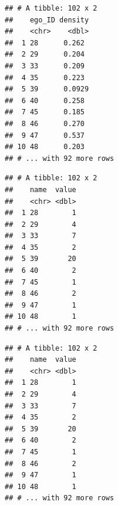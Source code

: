 \documentclass[
]{book}
\newenvironment{Shaded}{\begin{snugshade}}{\end{snugshade}}
\newcommand{\CommentTok}[1]{\textcolor[rgb]{0.56,0.35,0.01}{\textit{#1}}}
\newcommand{\FunctionTok}[1]{\textcolor[rgb]{0.00,0.00,0.00}{#1}}
\newcommand{\NormalTok}[1]{#1}
\newcommand{\SpecialCharTok}[1]{\textcolor[rgb]{0.00,0.00,0.00}{#1}}
\begin{document}
\begin{verbatim}
## # A tibble: 102 x 2
##    ego_ID density
##    <chr>    <dbl>
##  1 28      0.262 
##  2 29      0.204 
##  3 33      0.209 
##  4 35      0.223 
##  5 39      0.0929
##  6 40      0.258 
##  7 45      0.185 
##  8 46      0.270 
##  9 47      0.537 
## 10 48      0.203 
## # ... with 92 more rows
\end{verbatim}

\begin{Shaded}
\end{Shaded}

\begin{verbatim}
## # A tibble: 102 x 2
##    name  value
##    <chr> <dbl>
##  1 28        1
##  2 29        4
##  3 33        7
##  4 35        2
##  5 39       20
##  6 40        2
##  7 45        1
##  8 46        2
##  9 47        1
## 10 48        1
## # ... with 92 more rows
\end{verbatim}

\begin{Shaded}
\end{Shaded}

\begin{verbatim}
## # A tibble: 102 x 2
##    name  value
##    <chr> <dbl>
##  1 28        1
##  2 29        4
##  3 33        7
##  4 35        2
##  5 39       20
##  6 40        2
##  7 45        1
##  8 46        2
##  9 47        1
## 10 48        1
## # ... with 92 more rows
\end{verbatim}
\end{document}
